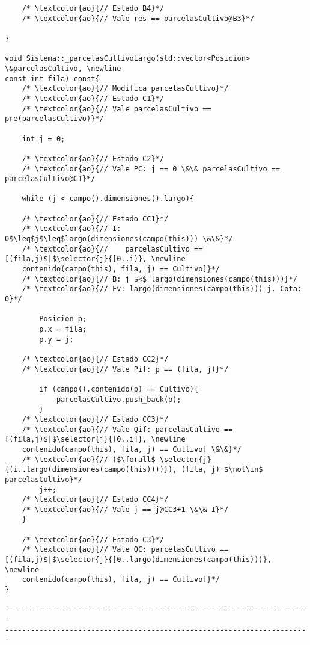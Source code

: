 \begin{lstlisting}
    /* \textcolor{ao}{// Estado B4}*/	    
    /* \textcolor{ao}{// Vale res == parcelasCultivo@B3}*/    
    
}

void Sistema::_parcelasCultivoLargo(std::vector<Posicion> \&parcelasCultivo, \newline  
const int fila) const{
	/* \textcolor{ao}{// Modifica parcelasCultivo}*/	        
    /* \textcolor{ao}{// Estado C1}*/	    
    /* \textcolor{ao}{// Vale parcelasCultivo == pre(parcelasCultivo)}*/      
    
    int j = 0;
	
	/* \textcolor{ao}{// Estado C2}*/	    
    /* \textcolor{ao}{// Vale PC: j == 0 \&\& parcelasCultivo == parcelasCultivo@C1}*/      
    
    while (j < campo().dimensiones().largo){

	/* \textcolor{ao}{// Estado CC1}*/	    
    /* \textcolor{ao}{// I: 0$\leq$j$\leq$largo(dimensiones(campo(this))) \&\&}*/        
    /* \textcolor{ao}{//    parcelasCultivo == [(fila,j)$|$\selector{j}{[0..i)}, \newline
    contenido(campo(this), fila, j) == Cultivo]}*/ 
    /* \textcolor{ao}{// B: j $<$ largo(dimensiones(campo(this)))}*/   
	/* \textcolor{ao}{// Fv: largo(dimensiones(campo(this)))-j. Cota: 0}*/
	     
        Posicion p;
        p.x = fila;
        p.y = j;

    /* \textcolor{ao}{// Estado CC2}*/   
	/* \textcolor{ao}{// Vale Pif: p == (fila, j)}*/
        
        if (campo().contenido(p) == Cultivo){
            parcelasCultivo.push_back(p);
        }
	/* \textcolor{ao}{// Estado CC3}*/
	/* \textcolor{ao}{// Vale Qif: parcelasCultivo == [(fila,j)$|$\selector{j}{[0..i]}, \newline
    contenido(campo(this), fila, j) == Cultivo] \&\&}*/
	/* \textcolor{ao}{// ($\forall$ \selector{j}{(i..largo(dimensiones(campo(this))))}), (fila, j) $\not\in$ parcelasCultivo}*/
        j++;
    /* \textcolor{ao}{// Estado CC4}*/   
	/* \textcolor{ao}{// Vale j == j@CC3+1 \&\& I}*/
    }
	
	/* \textcolor{ao}{// Estado C3}*/	    
    /* \textcolor{ao}{// Vale QC: parcelasCultivo == [(fila,j)$|$\selector{j}{[0..largo(dimensiones(campo(this)))}, \newline
    contenido(campo(this), fila, j) == Cultivo]}*/      
}

-----------------------------------------------------------------------
-----------------------------------------------------------------------


\end{lstlisting}
